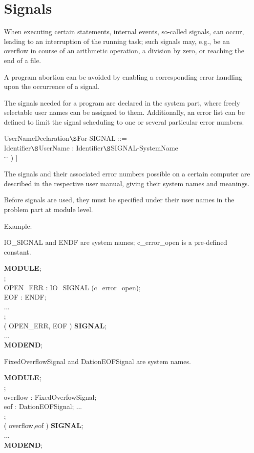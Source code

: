 \chapter{Signals}   %

When executing certain statements, internal events, so-called signals,
can occur, leading to an interruption of the running task; such signals
may, e.g., be an overflow in course of an arithmetic operation, a
division by zero, or reaching the end of a file.

A program abortion can be avoided by enabling a corresponding error
handling upon the occurrence of a signal.

The signals needed for a program are declared in the system part, where
freely selectable user names can be assigned to them. Additionally, an
error list can be defined to limit the signal scheduling to one or
several particular error numbers.

UserNameDeclaration$\S $For-SIGNAL ::= \\
\x Identifier$\S $UserName : Identifier$\S $SIGNAL-SystemName\\
\x \x [ ( Identifier$\S $ErrorNumber [ , Identifier$\S $ErrorNumber ] $^{...}$ ) ]

The signals and their associated error numbers possible on a certain
computer are described in the respective user manual, giving their
system names and meanings.

Before signals are used, they must be specified under their user names
in the problem part at module level.

Example:

\begin{removed}
IO\_SIGNAL and ENDF are system names; c\_error\_open is a pre-defined
constant.

{\bf MODULE};\\
;\\
\x \x OPEN\_ERR : IO\_SIGNAL (c\_error\_open);\\
\x \x EOF : ENDF;\\
\x \x ...\\
;\\
\x {} ( OPEN\_ERR, EOF ) {\bf SIGNAL};\\
\x \x ... \\
{\bf MODEND};
\end{removed}
\begin{added}
FixedOverflowSignal and DationEOFSignal are system names.

{\bf MODULE};\\
;\\
\x \x overflow : FixedOverfowSignal;\\
\x \x eof : DationEOFSignal;
\x \x ...\\
;\\
\x {} ( overflow,eof ) {\bf SIGNAL};\\
\x \x ... \\
{\bf MODEND};
\end{added}

